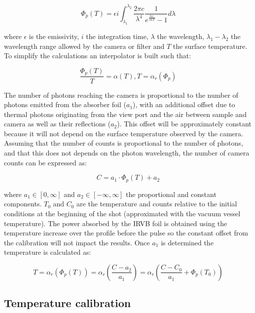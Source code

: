 \begin{equation}
{\Phi}_p (T) = \epsilon i \int_{ {\lambda}_1 }^{ {\lambda}_2 } {\frac{2 \pi c } { {\lambda}^4 } \frac {1} { e^{\frac {hc} {\lambda k T}} -1} {d \lambda} }
\label{eq:BBphotons1}
\end{equation}

where $\epsilon$ is the emissivity, $i$ the integration time, $\lambda$ the wavelength, $\lambda_1-\lambda_2$ the wavelength range allowed by the camera or filter and $T$ the surface temperature.
To simplify the calculations an interpolator is built such that:

\begin{equation}
\frac {{\Phi}_p (T)} {T} = \alpha (T) , T = {\alpha}_r ({\Phi}_p)
\label{eq:BBphotons2}
\end{equation}

The number of photons reaching the camera is proportional to the number of photons emitted from the absorber foil ($a_1$), with an additional offset due to thermal photons originating from the view port and the air between sample and camera as well as their reflections ($a_2$). This offset will be approximately constant because it will not depend on the surface temperature observed by the camera.
Assuming that the number of counts is proportional to the number of photons, and that this does not depends on the photon wavelength, the number of camera counts can be expressed as:

\begin{equation}
C = a_1 \cdot {\Phi}_p (T) + a_2
\label{eq:BBphotons3}
\end{equation}

where $a_1\in[0,\infty]$ and $a_2\in[-\infty,\infty]$ the proportional and constant components. $T_0$ and $C_0$ are the temperature and counts relative to the initial conditions at the beginning of the shot (approximated with the vacuum vessel temperature).
The power absorbed by the IRVB foil is obtained using the temperature increase over the profile before the pulse so the constant offset from the calibration will not impact the results.
Once $a_1$ is determined the temperature is calculated as:

\begin{equation}
T = {\alpha}_r ( {\Phi}_p(T)) = {\alpha}_r \left (\frac {C - a_2} {a_1} \right ) = {\alpha}_r \left (\frac {C - C_0} {a_1} + {\Phi}_p (T_0) \right )
\label{eq:BBphotons4}
\end{equation}

\subsection{Temperature calibration}\label{Temperature calibration}


